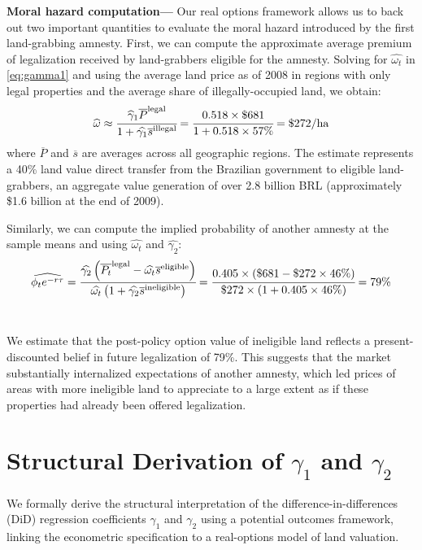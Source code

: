 \documentclass[12pt]{article}
\newcommand{\PTR}[1]{{\color{blue}{#1}}}
\begin{document}
\quad \textbf{Moral hazard computation---} Our real options framework allows us to back out two important quantities to evaluate the moral hazard introduced by the first land-grabbing amnesty. First, we can compute the approximate average premium of legalization received by land-grabbers eligible for the amnesty. Solving for $\widehat{\omega_t}$ in \eqref{eq:gamma1} and using the average land price as of 2008 in regions with only legal properties and the average share of illegally-occupied land, we obtain:
\begin{equation*}
\widehat{\omega}\approx\cfrac{\widehat{\gamma}_1\overline{P}^\text{legal}}{1+\widehat{\gamma_1}\overline{s}^\text{illegal}}=\cfrac{0.518\times\$681}{1+0.518\times57\%}=\$272/\text{ha}
\end{equation*} \PTR{think about \% or log points from initial model}
where $\overline{P}$ and $\overline{s}$ are averages across all geographic regions. The estimate represents a 40\% land value direct transfer from the Brazilian government to eligible land-grabbers, an aggregate value generation of over 2.8 billion BRL (approximately \$1.6 billion at the end of 2009). 
\

\quad Similarly, we can compute the implied probability of another amnesty at the sample means and using $\widehat{\omega_t}$ and $\widehat{\gamma_2}$:
\begin{equation*}
\widehat{\phi_te^{-r\tau}}=\cfrac{\widehat{\gamma_2}\left(\overline{P_t}^\text{legal}-\widehat{\omega_t}\overline{s}^\text{eligible}\right)}{\widehat{\omega_t}\left(1+\widehat{\gamma_2}\overline{s}^\text{ineligible} \right)}=\cfrac{0.405\times\left(\$681-\$272\times46\%\right)}{\$272\times\left(1+0.405\times46\% \right)}=79\%
\end{equation*}
\

\quad We estimate that the post-policy option value of ineligible land reflects a present-discounted belief in future legalization of 79\%. This suggests that the market substantially internalized expectations of another amnesty, which led prices of areas with more ineligible land to appreciate to a large extent as if these properties had already been offered legalization. 


\iffalse
\section*{Structural Derivation of \texorpdfstring{$\gamma_1$}{gamma1} and \texorpdfstring{$\gamma_2$}{gamma2}}

We formally derive the structural interpretation of the difference-in-differences (DiD) regression coefficients $\gamma_1$ and $\gamma_2$ using a potential outcomes framework, linking the econometric specification to a real-options model of land valuation.
\end{document}
